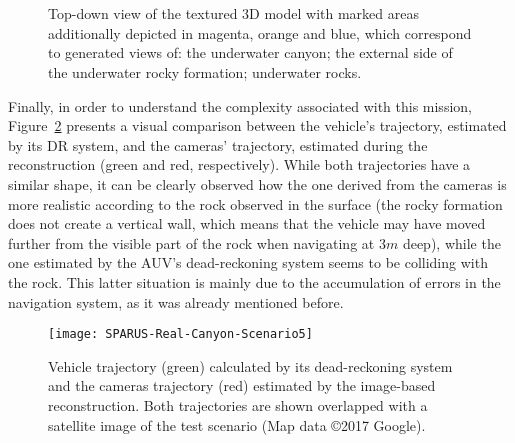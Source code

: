 \begin{figure}[htbp]
\myfloatalign
	\\
   	\quad
   	\\
\caption[3D reconstruction built from images gathered along the autonomous
mission presented in Fig.~\ref{fig:SPARUS-Canyon-Scenario}.]
{\protect {} Top-down view of the textured 3D model with
marked areas additionally depicted in magenta, orange and blue, which
correspond to generated views of:
\protect {} the underwater canyon; 
\protect {} the external side of the underwater rocky
formation; \protect {} underwater rocks.}
\label{fig:3D_reconstruction_texture}
\end{figure}

Finally, in order to understand the complexity associated with this mission,
Figure~\ref{fig:SPARUS-Overlapped-Trajectories} presents a visual comparison
between the vehicle's trajectory, estimated by its \ac{DR} system, and the
cameras' trajectory, estimated during the reconstruction (green and red,
respectively). While both trajectories have a similar shape, it can be clearly
observed how the one derived from the cameras is more realistic according to the
rock observed in the surface (the rocky formation does not create a vertical
wall, which means that the vehicle may have moved further from the visible part
of the rock when navigating at $3m$ deep), while the one estimated by the
\ac{AUV}'s dead-reckoning system seems to be colliding with the rock. This
latter situation is mainly due to the accumulation of errors in the navigation
system, as it was already mentioned before.

\begin{figure}[htbp]
\myfloatalign
	\texttt{[image: SPARUS-Real-Canyon-Scenario5]}
\caption[Comparison between the vehicle trajectory estimated by the DR system
and the one estimated with the cameras' images.]
{Vehicle trajectory (green) calculated by its dead-reckoning system and the
cameras trajectory (red) estimated by the image-based reconstruction. Both
trajectories are shown overlapped with a satellite image of the test scenario (Map
data \copyright 2017 Google).}
\label{fig:SPARUS-Overlapped-Trajectories}
\end{figure}


